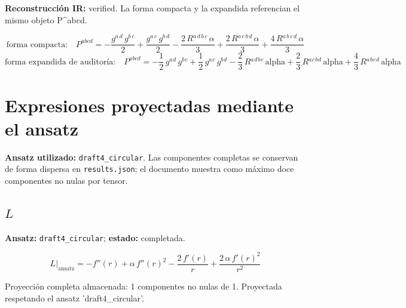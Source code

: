 \documentclass[11pt]{article}
\begin{document}
\textbf{Reconstrucción IR:} verified. La forma compacta y la expandida referencian el mismo objeto P^{abcd}.\par
\begin{dmath*}[breakdepth={5}]
\text{forma compacta:}\quad P^{abcd} = -\frac{g{}^{a\,d}\,g{}^{b\,c}}{2} + \frac{g{}^{a\,c}\,g{}^{b\,d}}{2} - \frac{2\,R{}^{a\,d\,b\,c}\,\alpha}{3} + \frac{2\,R{}^{a\,c\,b\,d}\,\alpha}{3} + \frac{4\,R{}^{a\,b\,c\,d}\,\alpha}{3}
\end{dmath*}
\begin{dmath*}[breakdepth={5}]
\text{forma expandida de auditoría:}\quad P^{abcd} = -\frac{1}{2}\,g{}^{a}{}^{d}\,g{}^{b}{}^{c} + \frac{1}{2}\,g{}^{a}{}^{c}\,g{}^{b}{}^{d} - \frac{2}{3}\,R{}^{a}{}^{d}{}^{b}{}^{c}\,\mathrm{alpha} + \frac{2}{3}\,R{}^{a}{}^{c}{}^{b}{}^{d}\,\mathrm{alpha} + \frac{4}{3}\,R{}^{a}{}^{b}{}^{c}{}^{d}\,\mathrm{alpha}
\end{dmath*}
\section*{Expresiones proyectadas mediante el ansatz}
\textbf{Ansatz utilizado:} \texttt{draft4\_circular}.
Las componentes completas se conservan de forma dispersa en \texttt{results.json}; el documento muestra como máximo doce componentes no nulas por tensor.
\subsection*{$ L $}
\textbf{Ansatz:} \texttt{draft4\_circular}; \textbf{estado:} completada.\par
\begin{dmath*}[breakdepth={5}]
L\big|_{\mathrm{ansatz}} = -f''\!\left(r\right) + \alpha\,{f''\!\left(r\right)}^{2} - \frac{2\,f'\!\left(r\right)}{r} + \frac{2\,\alpha\,{f'\!\left(r\right)}^{2}}{{r}^{2}}
\end{dmath*}
\par\smallskip
Proyección completa almacenada: 1 componentes no nulas de 1. Proyectada respetando el ansatz 'draft4\_circular'.\par\medskip
{}
\end{document}

